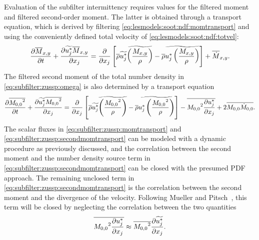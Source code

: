 Evaluation of the subfilter intermittency requires values for the filtered moment and filtered second-order moment. The latter is obtained through a transport equation, which is derived by filtering \cref{eq:lesmodels:soot:ndf:momtransport} and using the conveniently defined total velocity of \cref{eq:lesmodels:soot:ndf:totvel}:
\begin{equation}\label{eq:subfilter:zussp:momtransport}
  \pder[\mean{M}_{x,y}]{t} + \pder[\tf{u_j^*}\mean{M}_{x,y}]{x_j} = \pder[]{x_j}\left[ \mean{\rho}\tf{u_j^*}\tf{ \left( \frac{M_{x,y}}{\rho} \right)} - \mean{\rho}\tf{u_j^* \left( \frac{M_{x,y}}{\rho}\right)} \right] + \mean{\dot{M}}_{x,y}.
\end{equation}
The filtered second moment of the total number density in \cref{eq:subfilter:zussp:omega} is also determined by a transport equation
\begin{equation}\label{eq:subfilter:zussp:secondmomtransport}
  \pder[\mean{{M_{0,0}}^2}]{t} + \pder[\tf{u_j^*}\mean{{M_{0,0}}^2}]{x_j} = \pder[]{x_j}\left[ \mean{\rho}\tf{u_j^*}\tf{\left( \frac{{M_{0,0}}^2}{\rho} \right)} - \mean{\rho}\tf{u_j^* \left( \frac{{M_{0,0}}^2}{\rho} \right)} \right] - \mean{{M_{0,0}}^2 \pder[u_j^*]{x_j}} + 2\mean{M_{0,0}\dot{M}_{0,0}}.
\end{equation}
The scalar fluxes in \cref{eq:subfilter:zussp:momtransport} and \cref{eq:subfilter:zussp:secondmomtransport} can be modeled with a dynamic procedure as previously discussed, and the correlation between the second moment and the number density source term in \cref{eq:subfilter:zussp:secondmomtransport} can be closed with the presumed PDF approach. The remaining unclosed term in \cref{eq:subfilter:zussp:secondmomtransport} is the correlation between the second moment and the divergence of the velocity. Following Mueller and Pitsch~\cite{subfilterpdf2011}, this term will be closed by neglecting the correlation between the two quantities
\begin{equation}\label{eq:subfilter:zussp:nocorrelation}
  \mean{{M_{0,0}}^2 \pder[u_j^*]{x_j}} \approx \mean{{M_{0,0}}^2}\pder[\tf{u_j^*}]{x_j}.
\end{equation}
